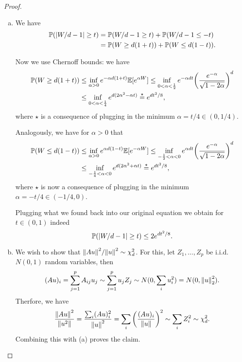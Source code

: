 \documentclass{article}
\theoremstyle{plain}
\theoremstyle{remark}
\newcommand{\Bb}{\mathbb}
\newcommand{\PP}{\Bb P}
\newcommand{\EE}{\Bb E}
\begin{document}
\begin{proof}
	\begin{enumerate}[(a)]
		\item We have
		\begin{align*}
		\PP(\abs{W/d - 1} \geq t) &= \PP(W/d - 1 \geq t)+ \PP(W/d - 1 \leq -t) \\
		&= \PP(W\geq d(1+t)) + \PP(W \leq d(1 -t)). 
		\end{align*}
		
		Now we use Chernoff bounds: we have 
		\begin{align*}
		\PP(W \geq d(1+t))  &\leq \inf_{\alpha > 0} e^{-\alpha d(1 + t)} \EE[e^{\alpha W}] \leq \inf_{0 < \alpha < \frac12} e^{-\alpha dt} \qty(\frac{e^{-\alpha}}{\sqrt{1 - 2\alpha}})^d  \\
		&\leq \inf_{0 < \alpha < \frac14} e^{d(2\alpha^2 - \alpha t)} \overset\star=  e^{dt^2/8}, 
		\end{align*}
		where $\star$ is a consequence of plugging in the minimum $\alpha = t/4 \in (0, 1/4)$. 
		
		Analogously, we have for $\alpha > 0$ that
		\begin{align*}
			\PP(W \leq d(1-t)) &\leq \inf_{\alpha > 0} e^{\alpha d(1-t)} \EE[e^{-\alpha W}] \leq \inf_{-\frac12 < \alpha < 0} e^{\alpha d t} \qty(\frac{e^{-\alpha}}{\sqrt{1 - 2\alpha}})^d \\
			&\leq \inf_{-\frac14 < \alpha < 0} e^{d(2\alpha^2 + \alpha t)} \overset\star= e^{dt^2/8},
		\end{align*}
	where $\star$ is now a consequence of plugging in the minimum $\alpha = -t/4 \in (-1/4, 0)$. 
	
	Plugging what we found back into our original equation we obtain for $t \in (0, 1)$ indeed
	\[
	\PP(\abs{W/d - 1} \geq t) \leq 2e^{dt^2/8}. 
	\]
	
	\item We wish to show that $\norm{Au}^2/\norm{u}^2 \sim \chi_d^2$. For this, let $Z_1, \dotsc, Z_p$ be i.i.d.\ $N(0, 1)$ random variables, then 
	\[
	(Au)_i = \sum_{j=1}^p A_{ij} u_j \sim \sum_{j=1}^p u_j Z_j \sim N(0, \sum_i u_i^2) = N(0, \norm{u}_2^2). 
	\]
	Therfore, we have 
	\[
	\frac{\norm{Au}^2}{\norm{u^2}} = \frac{\sum_i (Au)_i^2}{\norm{u}^2} = \sum_i \qty(\frac{(Au)_i}{\norm{u}})^2 \sim \sum_i Z_i^2 \sim \chi_d^2. 
	\]
	Combining this with (a) proves the claim.
	

\end{enumerate}
\end{proof}
\end{document}
